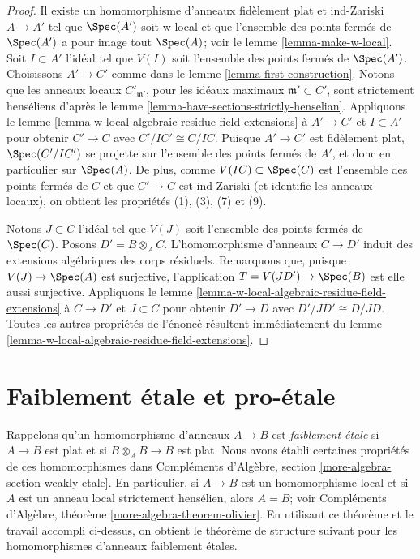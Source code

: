\begin{proof}
Il existe un homomorphisme d'anneaux fidèlement plat et ind-Zariski $A \to A'$ tel que
$\Spec(A')$ soit w-local et que l'ensemble des points fermés de
$\Spec(A')$ a pour image tout $\Spec(A)$; voir le lemme \ref{lemma-make-w-local}.
Soit $I \subset A'$ l'idéal tel que $V(I)$ soit l'ensemble
des points fermés de $\Spec(A')$.
Choisissons $A' \to C'$ comme dans le lemme \ref{lemma-first-construction}.
Notons que les anneaux locaux $C'_{\mathfrak m'}$, pour les idéaux maximaux
$\mathfrak m' \subset C'$, sont strictement henséliens d'après le
lemme \ref{lemma-have-sections-strictly-henselian}.
Appliquons le lemme \ref{lemma-w-local-algebraic-residue-field-extensions}
à $A' \to C'$ et $I \subset A'$ pour obtenir $C' \to C$ avec $C'/IC' \cong C/IC$.
Puisque $A' \to C'$ est fidèlement plat, $\Spec(C'/IC')$
se projette sur l'ensemble des points fermés de $A'$, et donc en particulier
sur $\Spec(A)$. De plus, comme $V(IC) \subset \Spec(C)$
est l'ensemble des points fermés de $C$ et que $C' \to C$ est ind-Zariski
(et identifie les anneaux locaux), on obtient les propriétés (1), (3), (7) et (9).

\medskip\noindent
Notons $J \subset C$ l'idéal tel que $V(J)$ soit l'ensemble des points fermés
de $\Spec(C)$. Posons $D' = B \otimes_A C$. L'homomorphisme d'anneaux
$C \to D'$ induit des extensions algébriques des corps résiduels. Remarquons que,
puisque $V(J) \to \Spec(A)$ est surjective, l'application $T = V(JD') \to \Spec(B)$
est elle aussi surjective. Appliquons le
lemme \ref{lemma-w-local-algebraic-residue-field-extensions}
à $C \to D'$ et $J \subset C$ pour obtenir 
$D' \to D$ avec $D'/JD' \cong D/JD$.
Toutes les autres propriétés de l'énoncé résultent
immédiatement du
lemme \ref{lemma-w-local-algebraic-residue-field-extensions}.
\end{proof}








\section{Faiblement \'etale et pro-\'etale}
\label{section-weakly-etale}

\noindent
Rappelons qu'un homomorphisme d'anneaux $A \to B$ est {\it faiblement \'etale}
si $A \to B$ est plat et si $B \otimes_A B \to B$ est plat. Nous avons
établi certaines propriétés de ces homomorphismes dans
Compléments d'Algèbre, section \ref{more-algebra-section-weakly-etale}.
En particulier, si $A \to B$ est un homomorphisme local et si $A$ est un
anneau local strictement hensélien, alors $A = B$; voir
Compléments d'Algèbre, théorème \ref{more-algebra-theorem-olivier}.
En utilisant ce théorème et le travail accompli ci-dessus, on obtient
le théorème de structure suivant pour les homomorphismes d'anneaux faiblement \'etales.

